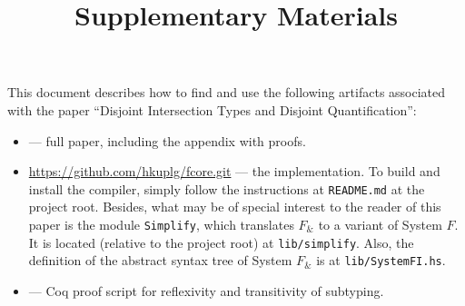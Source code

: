 \documentclass{article}
\begin{document}
\title{Supplementary Materials}
\maketitle

This document describes how to find and use the following artifacts associated
with the paper ``Disjoint Intersection Types and Disjoint Quantification'':

\begin{itemize}
  \item {} --- full paper, including the appendix with proofs.

  \item \url{https://github.com/hkuplg/fcore.git} --- the implementation. To build and install the
  compiler, simply follow the instructions at \texttt{README.md} at the project
  root. Besides, what may be of special interest to the reader of this paper is
  the module \texttt{Simplify}, which translates $ F_\&$ to a variant of System
  $F$. It is located (relative to the project root) at \texttt{lib/simplify}.
  Also, the definition of the abstract syntax tree of System $F_\&$ is at
  \texttt{lib/SystemFI.hs}.

  \item {} --- Coq proof script for reflexivity and transitivity of subtyping.
\end{itemize}
\end{document}
